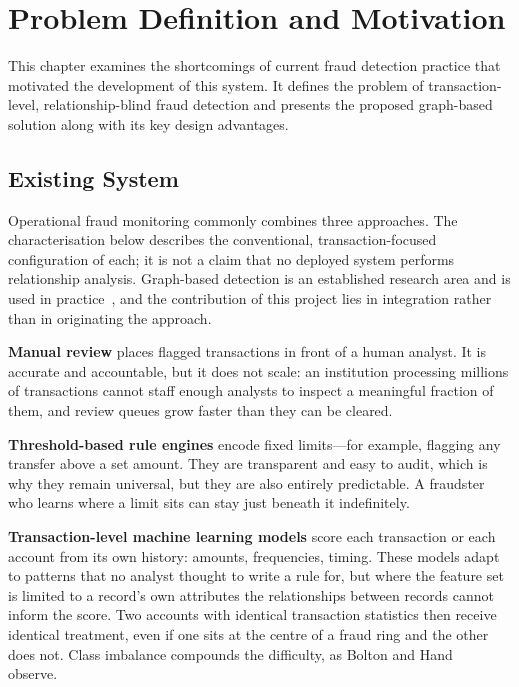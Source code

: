 \chapter{Problem Definition and Motivation}

This chapter examines the shortcomings of current fraud detection practice that motivated the development of this system. It defines the problem of transaction-level, relationship-blind fraud detection and presents the proposed graph-based solution along with its key design advantages.

\section{Existing System}
Operational fraud monitoring commonly combines three approaches. The characterisation below describes the conventional, transaction-focused configuration of each; it is not a claim that no deployed system performs relationship analysis. Graph-based detection is an established research area and is used in practice~\cite{pourhabibi2020}, and the contribution of this project lies in integration rather than in originating the approach.

\textbf{Manual review} places flagged transactions in front of a human analyst. It is accurate and accountable, but it does not scale: an institution processing millions of transactions cannot staff enough analysts to inspect a meaningful fraction of them, and review queues grow faster than they can be cleared.

\textbf{Threshold-based rule engines} encode fixed limits---for example, flagging any transfer above a set amount. They are transparent and easy to audit, which is why they remain universal, but they are also entirely predictable. A fraudster who learns where a limit sits can stay just beneath it indefinitely.

\textbf{Transaction-level machine learning models} score each transaction or each account from its own history: amounts, frequencies, timing. These models adapt to patterns that no analyst thought to write a rule for, but where the feature set is limited to a record's own attributes the relationships between records cannot inform the score. Two accounts with identical transaction statistics then receive identical treatment, even if one sits at the centre of a fraud ring and the other does not. Class imbalance compounds the difficulty, as Bolton and Hand~\cite{bolton2002} observe.

